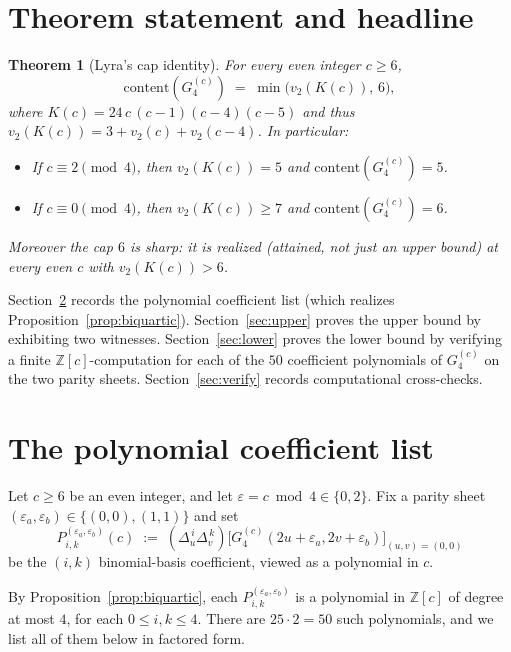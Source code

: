 \documentclass[11pt]{article}
\newtheorem{theorem}{Theorem}
\begin{document}
\section{Theorem statement and headline}

\begin{theorem}[Lyra's cap identity]\label{thm:main}
For every even integer $c \ge 6$,
\begin{equation}\label{eq:main}
  \mathrm{content}(G_4^{(c)}) \;=\; \min\bigl(v_2(K(c)),\, 6\bigr),
\end{equation}
where $K(c) = 24\,c\,(c-1)(c-4)(c-5)$ and thus $v_2(K(c)) = 3 + v_2(c) + v_2(c-4)$.
In particular:
\begin{itemize}
  \item If $c \equiv 2 \pmod 4$, then $v_2(K(c)) = 5$ and $\mathrm{content}(G_4^{(c)}) = 5$.
  \item If $c \equiv 0 \pmod 4$, then $v_2(K(c)) \ge 7$ and $\mathrm{content}(G_4^{(c)}) = 6$.
\end{itemize}
Moreover the cap $6$ is sharp: it is realized (attained, not just an upper bound) at every
even $c$ with $v_2(K(c)) > 6$.
\end{theorem}

Section~\ref{sec:coeffs} records the polynomial coefficient list (which realizes
Proposition~\ref{prop:biquartic}). Section~\ref{sec:upper} proves the upper bound
by exhibiting two witnesses. Section~\ref{sec:lower} proves the lower bound by
verifying a finite $\mathbb{Z}[c]$-computation for each of the $50$ coefficient
polynomials of $G_4^{(c)}$ on the two parity sheets. Section~\ref{sec:verify}
records computational cross-checks.

\section{The polynomial coefficient list}\label{sec:coeffs}

Let $c \ge 6$ be an even integer, and let $\varepsilon = c \bmod 4 \in \{0, 2\}$.
Fix a parity sheet $(\varepsilon_a, \varepsilon_b) \in \{(0,0), (1,1)\}$ and set
\[
  P^{(\varepsilon_a, \varepsilon_b)}_{i,k}(c) \;:=\; (\Delta_u^{\,i}\Delta_v^{\,k})\bigl[G_4^{(c)}(2u+\varepsilon_a, 2v+\varepsilon_b)\bigr]_{(u,v) = (0,0)}
\]
be the $(i,k)$ binomial-basis coefficient, viewed as a polynomial in $c$.

By Proposition~\ref{prop:biquartic}, each $P^{(\varepsilon_a, \varepsilon_b)}_{i,k}$ is a polynomial
in $\mathbb{Z}[c]$ of degree at most $4$, for each $0 \le i, k \le 4$. There are
$25 \cdot 2 = 50$ such polynomials, and we list all of them below in factored form.
\end{document}

